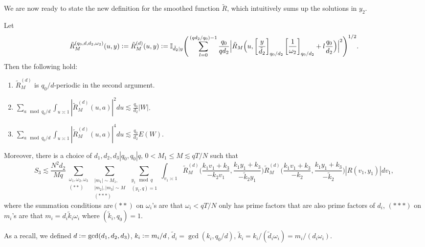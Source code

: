 We are now ready to state the new definition for the smoothed function $\tilde{R}$, which intuitively sums up the solutions in $y_2$.

\begin{proposition} \label{folding unfolding}
    Let
    \[
        \tilde{R}^{(q_0,d,d_2,\omega_2)}_M(u,y) \mathrel{\mathop:}= \tilde{R}^{(d)}_M(u,y) \mathrel{\mathop:}= \mathbb{I}_{\tilde{d}_2|y} \Bigg(\sum_{l=0}^{(qd_2/q_0)-1} \frac{q_0}{qd_2} \Big|\tilde{R}_M\Big(u,\left[\frac{y}{\tilde{d}_2}\right]_{q_0/d_2} \left[\frac{1}{\omega_2}\right]_{q_0/d_2} + l \frac{q_0}{d_2}\Big)\Big|^2\Bigg)^{1/2}.
    \]
    Then the following hold:\begin{enumerate}
        \item $\tilde{R}^{(d)}_M$ is $q_0/d$-periodic in the second argument.
        \item $\sum_{a\mod q_0/d} \int_{u\asymp 1 }|\tilde{R}^{(d)}_M(u,a)|^2 du\lesssim\frac{q_0}{d_2}| W|$.
        \item $\sum_{a\mod q_0/d} \int_{u\asymp 1 }|\tilde{R}^{(d)}_M(u,a)|^4 du\lesssim\frac{q_0}{d_2}E( W)$.
    \end{enumerate}
    Moreover, there is a choice of $d_1,d_2,d_3|q_0, q_0|q$, $0<M_1\leq M\lesssim qT/N$ such that  \[
        S_3\lesssim \frac{N^2d_2}{Mq} \sum_{\substack{\omega_1,\omega_2,\omega_3\\ (**)}}  \sum_{\substack{|m_1|\sim M_1,\\|m_2|,|m_3|\sim M\\
        (***)}}\sum_{\substack{y_1\mod q\\ (y_1,q)=1} }\int_{v_1\asymp 1}
        \tilde{R}_M^{(d)}\Big(\frac{k_1v_1+k_3}{-k_2v_1},\frac{k_1y_1+k_3}{-\tilde{k}_2y_1}\Big)\tilde{R}_M^{(d)}\Big(\frac{k_1v_1+k_3}{-k_2},\frac{k_1y_1+k_3}{-\tilde{k}_2}\Big)|R\left(v_1,y_1\right)| dv_1,
    \]
    where the summation conditions are$(**)$ on $\omega_i$'s are that $\omega_i<qT/N$ only has prime factors that are also prime factors of $d_i$, $(***)$ on $m_i$'s are that
    $m_i=d_i\tilde{k}_i\omega_i$ where $(\tilde{k}_i,q_0)=1$. 
\end{proposition}
\begin{remark}
    As a recall, we defined $d\mathrel{\mathop:}= \gcd(d_1,d_2,d_3)$, $k_i\mathrel{\mathop:}= m_i/d$, $\tilde{d}_i=\gcd(k_i,q_0/d)$, $\tilde{k}_i=k_i/(\tilde{d}_i\omega_i) = m_i/(d_i\omega_i)$.
\end{remark}
